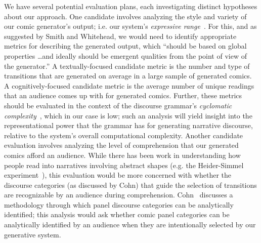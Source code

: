 We
have several potential evaluation plans, each investigating distinct
hypotheses about our approach.
%
One candidate involves analyzing the style and variety of our
comic generator's output; i.e. our system's 
\emph{expressive range}~\cite{smith2010analyzing}. For this, and as
suggested by Smith and Whitehead, we would need to identify
appropriate metrics for describing the generated output, which ``should be
based on global properties \ldots and ideally should be emergent qualities
from the point of view of the generator.'' A textually-focused candidate 
metric is the number and type of transitions that are generated on average
in a large sample of generated comics. A cognitively-focused candidate
metric is the average number of unique readings that an audience comes up
with for generated comics. Further, these metrics should be evaluated in
the context of the discourse grammar's \emph{cyclomatic
complexity}~\cite{mccabe1976complexity}, which in our case is low; such an
analysis will yield insight into the representational power that the
grammar has for generating narrative discourse, relative to the system's
overall computational complexity.
%
Another candidate evaluation involves analyzing the level of comprehension
that our generated comics afford an audience. While there has been work in
understanding how people read into narratives involving abstract
shapes (e.g. the Heider-Simmel experiment~\cite{heider1944experimental}),
this evaluation would be more concerned with whether the discourse
categories (as discussed by Cohn) that guide the selection of transitions
are recognizable by an audience during comprehension.
Cohn~\cite{cohn2015narrative} discusses a methodology through which panel
discourse categories can be analytically identified; this analysis would
ask whether comic panel categories can be analytically identified by an
audience when they are intentionally selected by our generative system.




